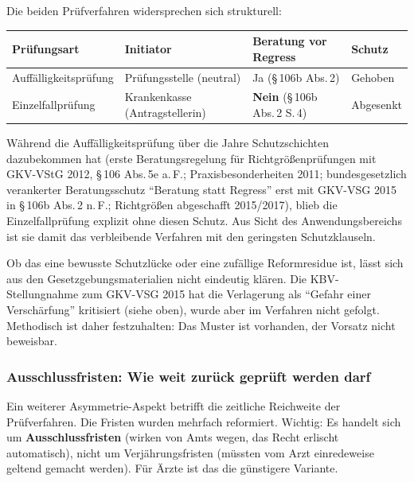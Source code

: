 \documentclass{umbruch-position}
\begin{document}
Die beiden Prüfverfahren widersprechen sich strukturell:

{\small
\begin{tabularx}{\textwidth}{X X X X}
\toprule
\textbf{Prüfungsart} & \textbf{Initiator} & \textbf{Beratung vor Regress} & \textbf{Schutz} \\
\midrule
Auffälligkeitsprüfung & Prüfungsstelle (neutral) & Ja (\S\,106b Abs.\,2) & Gehoben \\
Einzelfallprüfung & Krankenkasse (Antragstellerin) & \textbf{Nein} (\S\,106b Abs.\,2 S.\,4) & Abgesenkt \\
\bottomrule
\end{tabularx}
}

Während die Auffälligkeitsprüfung über die Jahre Schutzschichten dazubekommen hat (erste Beratungsregelung für Richtgrößenprüfungen mit GKV-VStG 2012, \S\,106 Abs.\,5e a.\,F.; Praxisbesonderheiten 2011; bundesgesetzlich verankerter Beratungsschutz ``Beratung statt Regress'' erst mit GKV-VSG 2015 in \S\,106b Abs.\,2 n.\,F.; Richtgrößen abgeschafft 2015/2017), blieb die Einzelfallprüfung explizit ohne diesen Schutz. Aus Sicht des Anwendungsbereichs ist sie damit das verbleibende Verfahren mit den geringsten Schutzklauseln.

Ob das eine bewusste Schutzlücke oder eine zufällige Reformresidue ist, lässt sich aus den Gesetzgebungsmaterialien nicht eindeutig klären. Die KBV-Stellungnahme zum GKV-VSG 2015 hat die Verlagerung als ``Gefahr einer Verschärfung'' kritisiert (siehe oben), wurde aber im Verfahren nicht gefolgt. Methodisch ist daher festzuhalten: Das Muster ist vorhanden, der Vorsatz nicht beweisbar.

\subsubsection{Ausschlussfristen: Wie weit zurück geprüft werden darf}
\label{sec:ausschlussfristen}

Ein weiterer Asymmetrie-Aspekt betrifft die zeitliche Reichweite der Prüfverfahren. Die Fristen wurden mehrfach reformiert. Wichtig: Es handelt sich um \textbf{Ausschlussfristen} (wirken von Amts wegen, das Recht erlischt automatisch), nicht um Verjährungsfristen (müssten vom Arzt einredeweise geltend gemacht werden). Für Ärzte ist das die günstigere Variante.
\end{document}
